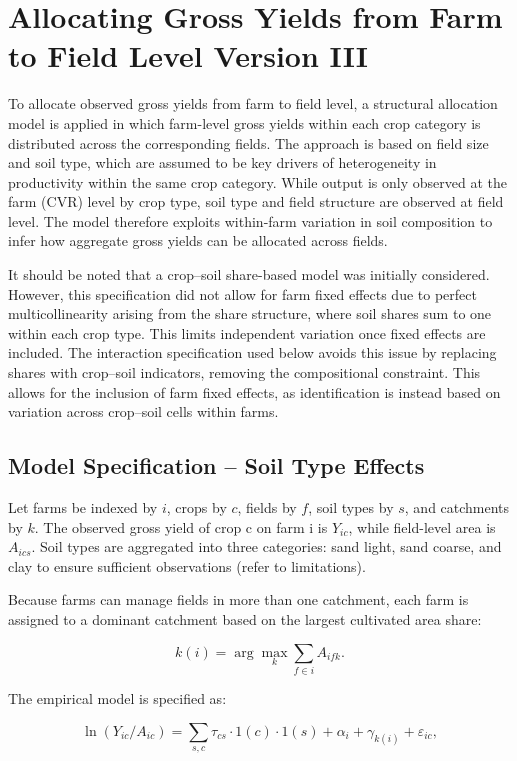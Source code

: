 \documentclass{article}
\begin{document}
\section{Allocating Gross Yields from Farm to Field Level Version III} 


 To allocate observed gross yields from farm to field level, a structural allocation model is applied in which farm-level gross yields within each crop category is distributed across the corresponding fields. The approach is based on field size and soil type, which are assumed to be key drivers of heterogeneity in productivity within the same crop category. While output is only observed at the farm (CVR) level by crop type, soil type and field structure are observed at field level. The model therefore exploits within-farm variation in soil composition to infer how aggregate gross yields can be allocated across fields.

It should be noted that a crop–soil share-based model was initially considered. However, this specification did not allow for farm fixed effects due to perfect multicollinearity arising from the share structure, where soil shares sum to one within each crop type. This limits independent variation once fixed effects are included. The interaction specification used below avoids this issue by replacing shares with crop–soil indicators, removing the compositional constraint. This allows for the inclusion of farm fixed effects, as identification is instead based on variation across crop–soil cells within farms.

\subsection{Model Specification – Soil Type Effects}


Let farms be indexed by $i$, crops by $c$, fields by $f$, soil types by $s$, and catchments by $k$. The observed gross yield of crop c on farm i is $Y_{ic}$, while field-level area is $A_{ics}$. Soil types are aggregated into three categories: sand light, sand coarse, and clay to ensure sufficient observations (refer to limitations).

Because farms can manage fields in more than one catchment, each farm is assigned to a dominant catchment based on the largest cultivated area share:

\[
k(i) = \arg\max_k \sum_{f \in i} A_{ifk}.
\]

The empirical model is specified as:

\[
\ln(Y_{ic}/A_{ic}) = \sum_{s,c} \tau_{cs} \cdot 1(c)\cdot 1(s) + \alpha_i + \gamma_{k(i)} + \varepsilon_{ic},
\]
\end{document}
